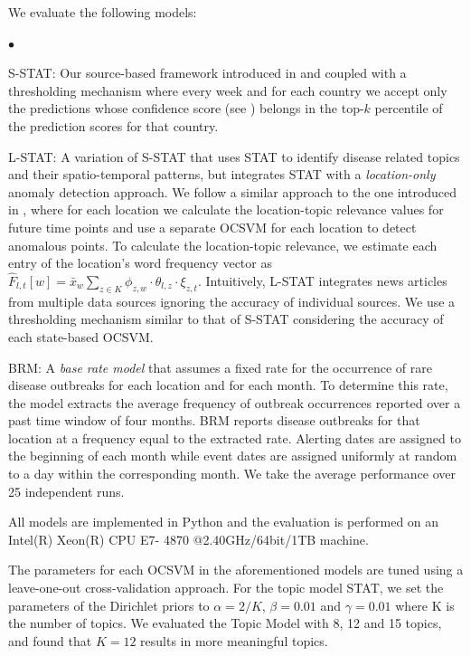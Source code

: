 \documentclass[conference]{IEEEtran}
\newcommand{\squishlist}{
   \begin{list}{$\bullet$}
    {
      \setlength{\itemsep}{0pt}
      \setlength{\parsep}{3pt}
      \setlength{\topsep}{3pt}
      \setlength{\partopsep}{0pt}
      \setlength{\leftmargin}{1.5em}
      \setlength{\labelwidth}{1em}
      \setlength{\labelsep}{0.5em} } }
\newcommand{\squishend}{
    \end{list}  }
\newcommand{\model}{{STAT}\xspace} %
\newcommand{\fullmodel}{{S-STAT}\xspace}
\newcommand{\locationmodel}{{L-STAT}\xspace}
\begin{document}
 We evaluate the following models:
\squishlist
\item \fullmodel: Our source-based framework introduced in  and  coupled with a thresholding mechanism where every week and for each country we accept only the predictions whose confidence score (see ) belongs in the top-$k$ percentile of the prediction scores for that country.
\item \locationmodel: A variation of \fullmodel that uses \model to identify disease related topics and their spatio-temporal patterns, but integrates \model with a {\em location-only} anomaly detection approach. We follow a similar approach to the one introduced in , where for each location we calculate the location-topic relevance values for future time points and use a separate OCSVM for each location to detect anomalous points. To calculate the location-topic relevance, we estimate each entry of the location's word frequency vector as $\hat{F}_{l,t}[w] = \bar{x}_{w} \sum_{z \in K}\phi_{z,w}\cdot \theta_{l,z} \cdot \xi_{z,t}$. Intuitively,  \locationmodel integrates news articles from multiple data sources ignoring the accuracy of individual sources. We use a thresholding mechanism similar to that of \fullmodel considering the accuracy of each state-based OCSVM. 
\item BRM: A {\em base rate model} that assumes a fixed rate for the occurrence of rare disease outbreaks for each location and for each
month. To determine this rate, the model extracts the average frequency of outbreak occurrences reported over a past time window of four months. BRM reports disease outbreaks for that location at a frequency equal to the extracted rate. Alerting dates are assigned to the beginning of each month while event dates are assigned uniformly at random to a day within the corresponding month. We take the average performance over 25 independent runs.
\squishend
All models are implemented in Python and the evaluation is performed on an Intel(R) Xeon(R) CPU E7- 4870 @2.40GHz/64bit/1TB machine. 


 The parameters for each OCSVM in the aforementioned models are tuned using a leave-one-out cross-validation approach. For the topic model \model, we set the parameters of the Dirichlet priors to $\alpha = 2/K$, $\beta = 0.01$ and $\gamma = 0.01$ where K is the number of topics. We evaluated the Topic Model with 8, 12 and 15 topics, and found that $K=12$ results in more meaningful topics.  
\end{document}
